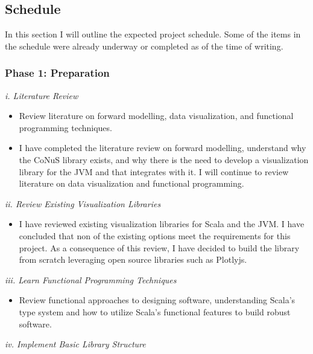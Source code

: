 \documentclass[12pt]{article}
\begin{document}
	\subsection{Schedule}
	In this section I will outline the expected project schedule. Some of the items in the schedule were already underway or completed as of the time of writing.
	
	\subsubsection{Phase 1: Preparation}
	
	\textit{i. Literature Review}
	
	\begin{itemize}
		\item Review literature on forward modelling, data visualization, and functional programming techniques.
		
		\item I have completed the literature review on forward modelling, understand why the CoNuS library exists, and why there is the need to develop a visualization library for the JVM and that integrates with it. I will continue to review literature on data visualization and functional programming.
	\end{itemize}
	
	\textit{ii. Review Existing Visualization Libraries}
	
	\begin{itemize}
		\item I have reviewed existing visualization libraries for Scala and the JVM. I have concluded that non of the existing options meet the requirements for this project. As a consequence of this review, I have decided to build the library from scratch leveraging open source libraries such as Plotlyjs.
	\end{itemize}
	
	\textit{iii. Learn Functional Programming Techniques}
	
	\begin{itemize}
		
		\item Review functional approaches to designing software, understanding Scala's type system and how to utilize Scala's functional features to build robust software.
		
	\end{itemize}
	
	\textit{iv. Implement Basic Library Structure}
	
\end{document}
